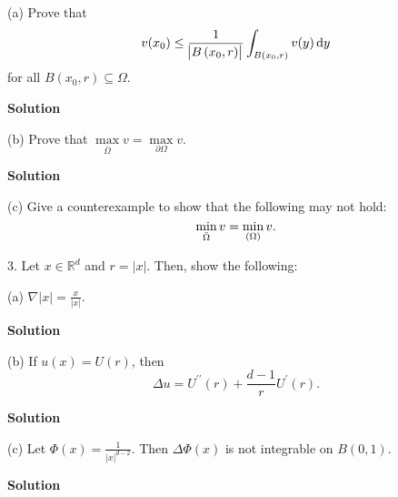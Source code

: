 \documentclass{article}
\begin{document}
(a) Prove that
%
\begin{equation*}
    v(x_0) \leq \frac{1}{\envert{B\del{x_0, r}}} \int_{B(x_0, r)} v(y) \dif y
\end{equation*}
%
for all $B(x_0, r) \subseteq \Omega$.

\textbf{Solution}

\vspace{5mm}

(b) Prove that $\max\limits_{\bar{\Omega}} v = \max\limits_{\partial \Omega} v$.

\textbf{Solution}

\vspace{5mm}

(c) Give a counterexample to show that the following may not hold:
%
\begin{equation*}
    \min_{\bar \Omega} v = \min_{\del\Omega} v
    .
\end{equation*}

\newpage

3. Let $x \in \mathbb{R}^d$ and $r = |x|$. Then, show the following:

(a) $\nabla |x| = \frac{x}{|x|}$.

\textbf{Solution}

\vspace{5mm}

(b) If $u(x) = U(r)$, then
%
\begin{equation*}
    \Delta u = U^{\prime \prime}(r) + \frac{d - 1}{r} U^\prime(r).
\end{equation*}

\textbf{Solution}

\vspace{5mm}

(c) Let $\Phi(x) = \frac{1}{|x|^{d-2}}$. Then $\Delta \Phi(x)$ is not
integrable on $B(0, 1)$.

\textbf{Solution}
\end{document}
